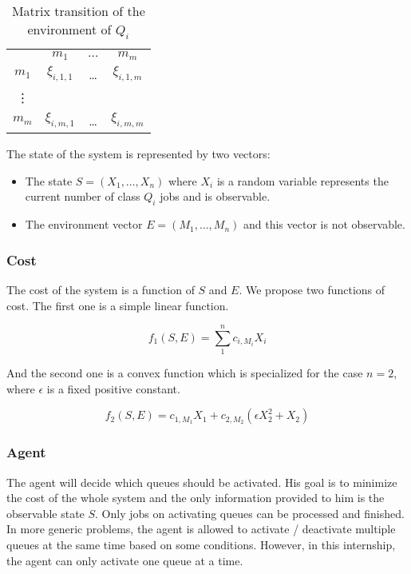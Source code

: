 \documentclass[
  a4paper, xcolor = usenames,dvipsnames]{article}
\providecommand{\tightlist}{%
  \setlength{\itemsep}{0pt}\setlength{\parskip}{0pt}}
\theoremstyle{definition}
\theoremstyle{definition}
\theoremstyle{definition}
\theoremstyle{definition}
\theoremstyle{remark}
\begin{document}
\begin{table}[!htbp]
\caption{Matrix transition of the environment of $Q_{i}$}
\begin{center}
\begin{tabular}{c c c c}
    \hline
    & $m_{1}$ & $\dots$ & $m_{m}$ \\
    $m_{1}$ & $\xi_{i, 1, 1}$ & \dots & $\xi_{i, 1, m}$ \\
    \vdots \\
    $m_{m}$ & $\xi_{i, m, 1}$ & \dots & $\xi_{i, m, m}$ \\
    \hline
\end{tabular}
\end{center}
\label{tab:mat-transition-ci}
\end{table}

The state of the system is represented by two vectors:

\begin{itemize}
\tightlist
\item
  The state \(S = (X_{1}, \dots, X_{n})\) where \(X_{i}\) is a random variable represents the current number of class \(Q_{i}\) jobs and is observable.
\item
  The environment vector \(E = (M_{1}, \dots, M_{n})\) and this vector is not observable.
\end{itemize}

\hypertarget{cost}{%
\subsubsection{Cost}\label{cost}}

The cost of the system is a function of \(S\) and \(E\). We propose two functions of cost. The first one is a simple linear function.

\[
f_{1}(S, E) = \sum_{1}^{n} c_{i, M_{i}} X_{i}
\]

And the second one is a convex function which is specialized for the case \(n = 2\), where \(\epsilon\) is a fixed positive constant.

\[
f_{2}(S, E) = c_{1, M_{1}} X_{1} + c_{2, M_{2}} (\epsilon X_{2}^{2} + X_{2})
\]

\hypertarget{agent}{%
\subsubsection{Agent}\label{agent}}

The agent will decide which queues should be activated. His goal is to minimize the cost of the whole system and the only information provided to him is the observable state \(S\). Only jobs on activating queues can be processed and finished. In more generic problems, the agent is allowed to activate / deactivate multiple queues at the same time based on some conditions. However, in this internship, the agent can only activate one queue at a time.
\end{document}

